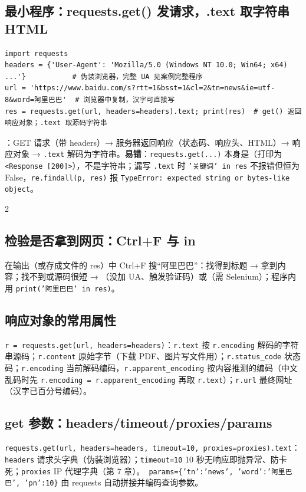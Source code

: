 \subsection{最小程序：requests.get() 发请求，.text 取字符串 HTML}\label{sec:D06-min}
\begin{lstlisting}[style=pyD06]
import requests
headers = {'User-Agent': 'Mozilla/5.0 (Windows NT 10.0; Win64; x64) ...'}           # 伪装浏览器，完整 UA 见案例完整程序
url = 'https://www.baidu.com/s?rtt=1&bsst=1&cl=2&tn=news&ie=utf-8&word=阿里巴巴'  # 浏览器中复制，汉字可直接写
res = requests.get(url, headers=headers).text; print(res)  # get() 返回响应对象；.text 取源码字符串
\end{lstlisting}
：GET 请求（带 headers）→ 服务器返回响应（状态码、响应头、HTML）→ 响应对象 → \texttt{.text} 解码为字符串。\textbf{易错}：\texttt{requests.get(...)} 本身是（打印为 \texttt{<Response [200]>}），不是字符串；漏写 \texttt{.text} 时 \texttt{'关键词' in res} 不报错但恒为 False，\texttt{re.findall(p, res)} 报 \texttt{TypeError: expected string or bytes-like object}。

\begin{multicols}{2}\raggedcolumns\sloppy
\subsection{检验是否拿到网页：Ctrl+F 与 in}
在输出（或存成文件的 res）中 Ctrl+F 搜“阿里巴巴”：找得到标题 → 拿到内容；找不到或源码很短 → （没加 UA、触发验证码）或（需 Selenium）；程序内用 \texttt{print('阿里巴巴' in res)}。

\subsection{响应对象的常用属性 \texorpdfstring{\tagext}{（拓展）}}
\texttt{r = requests.get(url, headers=headers)}：\texttt{r.text} 按 \texttt{r.encoding} 解码的字符串源码；\texttt{r.content} 原始字节（下载 PDF、图片写文件用）；\texttt{r.status\_code} 状态码；\texttt{r.encoding} 当前解码编码，\texttt{r.apparent\_encoding} 按内容推测的编码（中文乱码时先 \texttt{r.encoding = r.apparent\_encoding} 再取 \texttt{r.text}）；\texttt{r.url} 最终网址（汉字已百分号编码）。

\subsection{get 参数：headers/timeout/proxies/params}
\texttt{requests.get(url, headers=headers, timeout=10, proxies=proxies).text}：\texttt{headers} 请求头字典（伪装浏览器）；\texttt{timeout=10} 10 秒无响应即抛异常、防卡死；\texttt{proxies} IP 代理字典（第 7 章）。\tagext\ \texttt{params=\{'tn':'news', 'word':'阿里巴巴', 'pn':10\}} 由 requests 自动拼接并编码查询参数。
\end{multicols}

